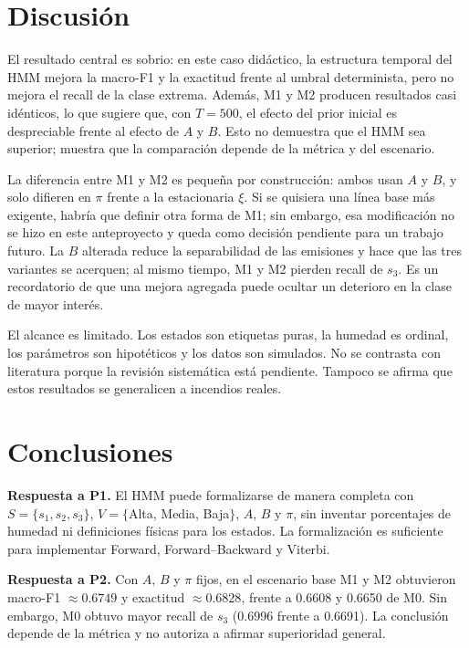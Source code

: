 \documentclass[11pt,a4paper]{article}
\begin{document}
\section{Discusión}

El resultado central es sobrio: en este caso didáctico, la estructura temporal del HMM mejora la macro-F1 y la exactitud frente al umbral determinista, pero no mejora el recall de la clase extrema. Además, M1 y M2 producen resultados casi idénticos, lo que sugiere que, con \(T=500\), el efecto del prior inicial es despreciable frente al efecto de \(A\) y \(B\). Esto no demuestra que el HMM sea superior; muestra que la comparación depende de la métrica y del escenario.

La diferencia entre M1 y M2 es pequeña por construcción: ambos usan \(A\) y \(B\), y solo difieren en \(\pi\) frente a la estacionaria \(\xi\). Si se quisiera una línea base más exigente, habría que definir otra forma de M1; sin embargo, esa modificación no se hizo en este anteproyecto y queda como decisión pendiente para un trabajo futuro. La \(B\) alterada reduce la separabilidad de las emisiones y hace que las tres variantes se acerquen; al mismo tiempo, M1 y M2 pierden recall de \(s_3\). Es un recordatorio de que una mejora agregada puede ocultar un deterioro en la clase de mayor interés.

El alcance es limitado. Los estados son etiquetas puras, la humedad es ordinal, los parámetros son hipotéticos y los datos son simulados. No se contrasta con literatura porque la revisión sistemática está pendiente. Tampoco se afirma que estos resultados se generalicen a incendios reales.

\section{Conclusiones}

\textbf{Respuesta a P1.} El HMM puede formalizarse de manera completa con \(S=\{s_1,s_2,s_3\}\), \(V=\{\)Alta, Media, Baja\(\}\), \(A\), \(B\) y \(\pi\), sin inventar porcentajes de humedad ni definiciones físicas para los estados. La formalización es suficiente para implementar Forward, Forward--Backward y Viterbi.

\textbf{Respuesta a P2.} Con \(A\), \(B\) y \(\pi\) fijos, en el escenario base M1 y M2 obtuvieron macro-F1 \(\approx 0.6749\) y exactitud \(\approx 0.6828\), frente a 0.6608 y 0.6650 de M0. Sin embargo, M0 obtuvo mayor recall de \(s_3\) (0.6996 frente a 0.6691). La conclusión depende de la métrica y no autoriza a afirmar superioridad general.
\end{document}

